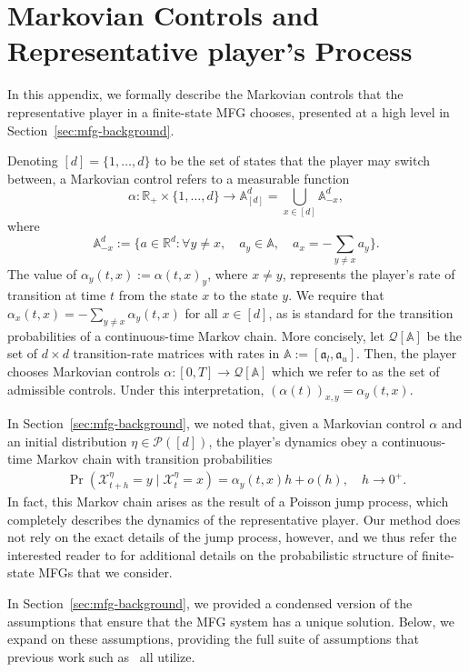 \documentclass[11pt,reqno]{amsart}
\numberwithin{equation}{section}
\theoremstyle{plain}
\newcommand{\R}{\mathbb{R}}
\newcommand{\calP}{{\mathcal P}}
\newcommand{\calX}{{\mathcal X}}
\newcommand{\A}{\mathbb{A}}
\newcommand{\1}{\boldsymbol{\mathbbm{1}}}
\begin{document}
\section{Markovian Controls and Representative player's Process}
\label{sec:jump-process}
In this appendix, we formally describe the Markovian controls that the representative player in a finite-state MFG chooses, presented at a high level in Section~\ref{sec:mfg-background}.

Denoting $[d] = \{1, \ldots, d\}$ to be the set of states that the player may switch between, a Markovian control refers to a measurable function$$\alpha : \R_+ \times \{1, \ldots, d\} \to \A_{[d]}^d = \bigcup_{x \in [d]} \A_{-x}^d,$$where
\[
    \textstyle \A_{-x}^d := \big\{ a \in \R^d : \forall y \neq x, \quad a_y \in \A, \quad a_x = -\sum_{y \neq x} a_y \big\}.
\]
The value of $\alpha_y(t, x) := \alpha(t, x)_y$, where $x \neq y$, represents the player's rate of transition at time $t$ from the state $x$ to the state $y$. We require that $\alpha_x(t, x) = - \sum_{y \neq x} \alpha_y(t, x)$ for all $x \in [d]$, as is standard for the transition probabilities of a continuous-time Markov chain. More concisely, let $\mathcal{Q}[\A]$ be the set of $d \times d$ transition-rate matrices with rates in $\A := [\mathfrak{a}_l, \mathfrak{a}_u]$. Then, the player chooses Markovian controls $\alpha : [0, T] \to \mathcal{Q}[\A]$ which we refer to as the set of admissible controls. Under this interpretation, $(\alpha(t))_{x, y} = \alpha_y(t, x)$.

In Section~\ref{sec:mfg-background}, we noted that, given a Markovian control $\alpha$ and an initial distribution $\eta \in \calP([d])$, the player's dynamics obey a continuous-time Markov chain with transition probabilities
\begin{align*}
    \Pr(\calX_{t + h}^\eta = y \mid \calX_t^\eta = x) = \alpha_y(t, x) h + o(h), \quad h \to 0^+.
\end{align*}
In fact, this Markov chain arises as the result of a Poisson jump process, which completely describes the dynamics of the representative player. Our method does not rely on the exact details of the jump process, however, and we thus refer the interested reader to \cite[Section 2.3]{Cecchin2017} for additional details on the probabilistic structure of finite-state MFGs that we consider.

In Section~\ref{sec:mfg-background}, we provided a condensed version of the assumptions that ensure that the MFG system has a unique solution. Below, we expand on these assumptions, providing the full suite of assumptions that previous work such as~\cite{bay-coh2019, cec-pel2019, coh-lau-zel2025} all utilize.
\end{document}
